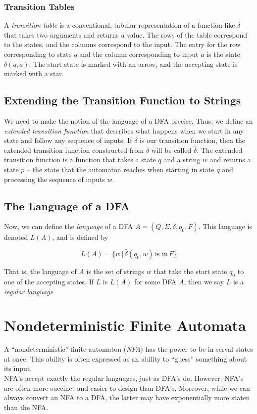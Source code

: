 \documentclass[]{article}
\begin{document}
    \subsubsection*{Transition Tables}
      A \emph{transition table} is a conventional, tabular representation of a
      function like $\delta$ that takes two arguments and returns a value. The
      rows of the table correspond to the states, and the columns correspond
      to the input. The entry for the row corresponding to state $q$ and the
      column corresponding to input $a$ is the state $\delta(q,a)$. The start
      state is marked with an arrow, and the accepting state is marked with a
      star.
      
  \subsection*{Extending the Transition Function to Strings}
    We need to make the notion of the language of a DFA precise. Thus, we
    define an \emph{extended transition function} that describes what happens
    when we start in any state and follow any sequence of inputs. If $\delta$
    is our transition function, then the extended transition function 
    constructed from $\delta$ will be called $\hat{\delta}$. The extended 
    transition function is a function that takes a state $q$ and a string $w$ 
    and returns a state $p$ -- the state that the automaton reaches when 
    starting in state $q$ and processing the sequence of inputs $w$.
    
  \subsection*{The Language of a DFA}
    Now, we can define the \emph{language} of a DFA $A = (Q, \Sigma, \delta, 
    q_0, F)$. This language is denoted $L(A)$, and is defined by
    
      \[ L(A) = \{w\, | \, \hat{\delta}(q_0, w) \, \text{is in} \, F\} \]
    
    That is, the language of $A$ is the set of strings $w$ that take the start 
    state $q_0$ to one of the accepting states. If $L$ is $L(A)$ for some DFA 
    $A$, then we say $L$ is a \emph{regular language}
    
\section*{Nondeterministic Finite Automata}
  A ``nondeterministic'' finite automaton (\emph{NFA}) has the power to be in 
  serval states at once. This ability is often expressed as an ability to 
  ``guess'' something about its input. \\
  \indent NFA's accept exactly the regular languages, just as DFA's do. 
  However, NFA's are often more succinct and easier to design than DFA's. 
  Moreover, while we can always convert an NFA to a DFA, the latter may have 
  exponentially more staten than the NFA.
  
\end{document}

